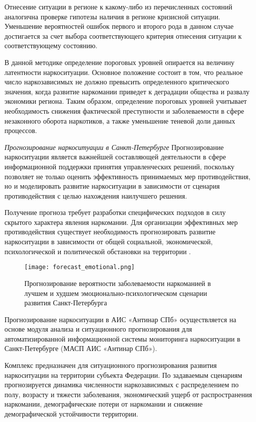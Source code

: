 Отнесение ситуации в регионе к какому-либо из перечисленных состояний аналогична
проверке гипотезы наличия в регионе кризисной ситуации. Уменьшение вероятностей
ошибок первого и второго рода в данном случае достигается за счет выбора
соответствующего критерия отнесения ситуации к соответствующему состоянию. 

В данной методике определение пороговых уровней опирается на величину
латентности наркоситуации. Основное положение состоит в том, что реальное число
наркозависимых не должно превысить определенного критического значения, когда
развитие наркомании приведет к деградации общества и развалу экономики региона.
Таким образом, определение пороговых уровней учитывает необходимость снижения
фактической преступности и заболеваемости в сфере незаконного оборота
наркотиков, а также уменьшение теневой доли данных процессов.

\textit{Прогнозирование наркоситуации в Санкт-Петербурге}
Прогнозирование наркоситуации является важнейшей составляющей деятельности в
сфере информационной поддержки принятия управленческих решений, поскольку
позволяет не только оценить эффективность принимаемых мер противодействия, но и
моделировать развитие наркоситуации в зависимости от сценария противодействия с
целью нахождения наилучшего решения.

Получение прогноза требует разработки специфических подходов в силу скрытого
характера явления наркомании. Для организации эффективных мер противодействия
существует необходимость прогнозировать развитие наркоситуации в зависимости от
общей социальной, экономической, психологической и политической  обстановки на
территории \cite{Mityagin2012}.

\begin{figure}
    \texttt{[image: forecast\_emotional.png]}
    \caption{Прогнозирование вероятности заболеваемости наркоманией в лучшем и
    худшем эмоционально-психологическом сценарии развития Санкт-Петербурга}
    \label{fig:forecast_emotional}
\end{figure}

Прогнозирование наркоситуации в АИС «Антинар СПб» осуществляется на основе
модуля анализа и ситуационного прогнозирования для автоматизированной
информационной системы мониторинга наркоситуации в Санкт-Петербурге (МАСП АИС
«Антинар СПб»). 

Комплекс предназначен для ситуационного прогнозирования развития наркоситуации
на территории субъекта Федерации. По задаваемым сценариям прогнозируется
динамика численности наркозависимых с распределением по полу, возрасту и тяжести
заболевания, экономический ущерб от распространения наркомании, демографические
потери от наркомании и снижение демографической устойчивости территории.

